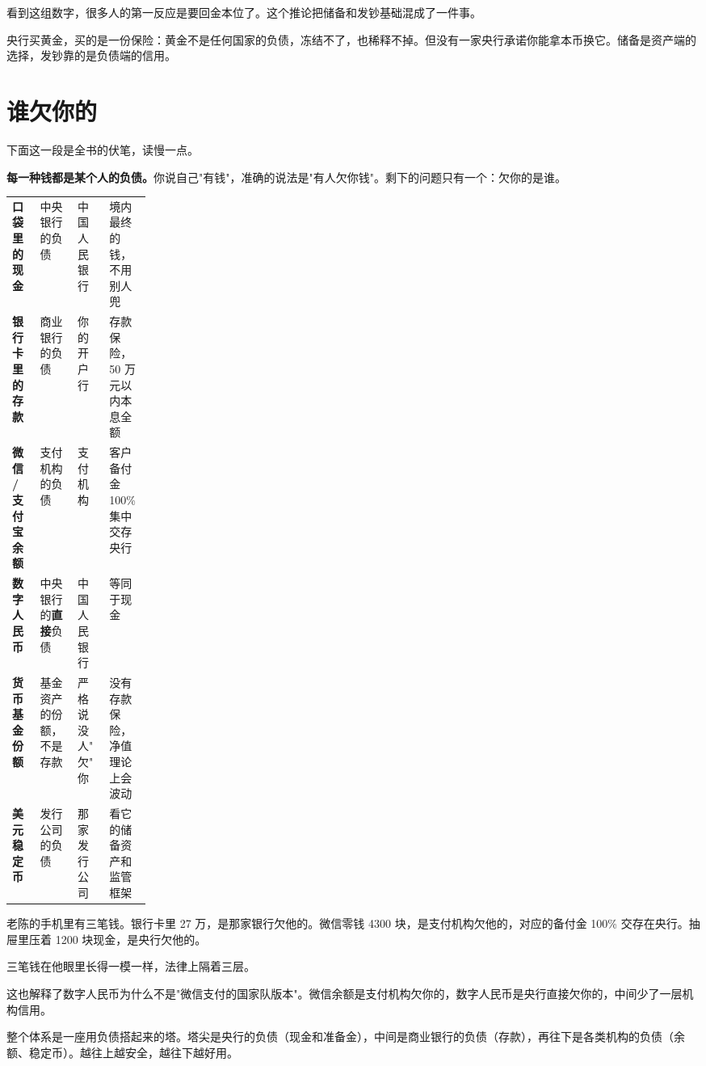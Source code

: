 看到这组数字，很多人的第一反应是要回金本位了。这个推论把储备和发钞基础混成了一件事。

央行买黄金，买的是一份保险：黄金不是任何国家的负债，冻结不了，也稀释不掉。但没有一家央行承诺你能拿本币换它。储备是资产端的选择，发钞靠的是负债端的信用。

\section{谁欠你的}

下面这一段是全书的伏笔，读慢一点。

\textbf{每一种钱都是某个人的负债。}你说自己"有钱"，准确的说法是"有人欠你钱"。剩下的问题只有一个：欠你的是谁。

\begin{tablewrap}
\begin{xltabular}{\linewidth}{>{\raggedright\arraybackslash}p{0.20\linewidth}XXX}
\toprule
{} &  &  &  \\
\midrule
\textbf{口袋里的现金} & 中央银行的负债 & 中国人民银行 & 境内最终的钱，不用别人兜 \\
\textbf{银行卡里的存款} & 商业银行的负债 & 你的开户行 & 存款保险，50 万元以内本息全额 \\
\textbf{微信 / 支付宝余额} & 支付机构的负债 & 支付机构 & 客户备付金 100\% 集中交存央行 \\
\textbf{数字人民币} & 中央银行的\textbf{直接}负债 & 中国人民银行 & 等同于现金 \\
\textbf{货币基金份额} & 基金资产的份额，不是存款 & 严格说没人"欠"你 & 没有存款保险，净值理论上会波动 \\
\textbf{美元稳定币} & 发行公司的负债 & 那家发行公司 & 看它的储备资产和监管框架 \\
\bottomrule
\end{xltabular}
\end{tablewrap}

老陈的手机里有三笔钱。银行卡里 27 万，是那家银行欠他的。微信零钱 4300 块，是支付机构欠他的，对应的备付金 100\% 交存在央行。抽屉里压着 1200 块现金，是央行欠他的。

三笔钱在他眼里长得一模一样，法律上隔着三层。

这也解释了数字人民币为什么不是"微信支付的国家队版本"。微信余额是支付机构欠你的，数字人民币是央行直接欠你的，中间少了一层机构信用。

整个体系是一座用负债搭起来的塔。塔尖是央行的负债（现金和准备金），中间是商业银行的负债（存款），再往下是各类机构的负债（余额、稳定币）。越往上越安全，越往下越好用。

